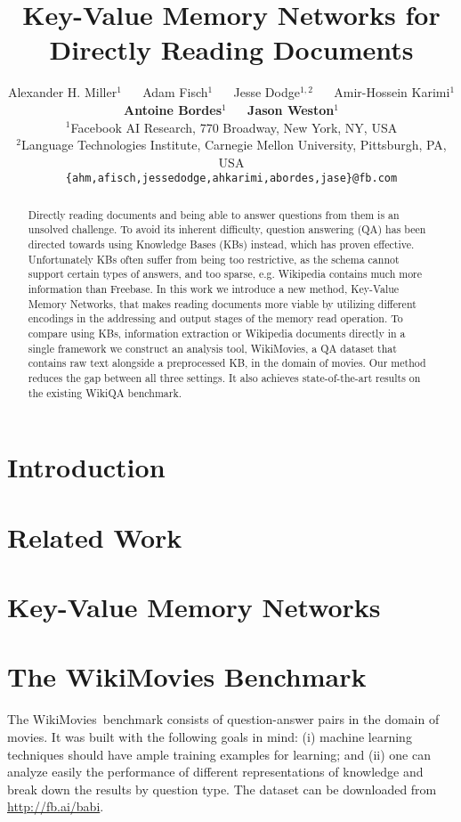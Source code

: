 \documentclass[11pt,letterpaper]{article}
\title{Key-Value Memory Networks for Directly Reading Documents}
\author{
Alexander H. Miller$^{1}$ \mbox{~~}
Adam Fisch$^{1}$ \mbox{~~}
Jesse Dodge$^{1,2}$ \mbox{~~}
Amir-Hossein Karimi$^{1}$ \\
{\bf Antoine Bordes$^{1}$} \mbox{~~}
{\bf Jason Weston$^{1}$} \\
$^{1}$Facebook AI Research, 770 Broadway, New York, NY, USA\\
$^{2}$Language Technologies Institute, Carnegie Mellon University, Pittsburgh, PA, USA\\
{\tt \{ahm,afisch,jessedodge,ahkarimi,abordes,jase\}@fb.com}
 }
\date{}
\newcommand{\WikiMovies}{{\sc WikiMovies}\xspace}
\begin{document}
\maketitle

\begin{abstract}
Directly reading documents and being able to answer questions from them is an unsolved challenge.
To avoid its inherent difficulty, question answering (QA) has been directed towards
using Knowledge Bases (KBs) instead,
which has proven effective.
Unfortunately KBs often suffer from being too restrictive, as the schema cannot support certain types of answers,
and too sparse, e.g. Wikipedia contains much more information than Freebase.
In this work we introduce a new method, Key-Value Memory Networks,
that makes reading documents more viable
by utilizing different encodings in the addressing  and output stages of the memory read operation.
To compare using  KBs, information extraction or Wikipedia documents directly in a single
framework we construct
 an analysis tool, {\sc WikiMovies}, a QA dataset that contains raw text alongside a preprocessed KB, in the domain of movies.
Our method reduces the gap between all three settings.
It also achieves state-of-the-art results on the existing {\sc WikiQA} benchmark.
\end{abstract}

\section{Introduction}
\vspace{-0.5ex}


\section{Related Work}
\vspace{-0.5ex}


\section{Key-Value Memory Networks} \label{sec:models}
\vspace{-0.5ex}


\section{The WikiMovies Benchmark} \label{sec:data}
\vspace{-0.5ex}
The \WikiMovies ~benchmark consists of question-answer pairs in the domain of movies.
It was built with the following goals in mind:
(i) machine learning techniques should have ample training examples for learning;
and (ii) one can analyze easily the performance of different representations of knowledge and break
down the results by question type.
%
The dataset can be downloaded from \url{http://fb.ai/babi}.
\end{document}
